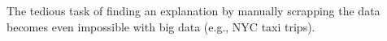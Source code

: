 The tedious task of finding an explanation by manually scrapping the data becomes even impossible with big data (e.g., NYC taxi trips).













